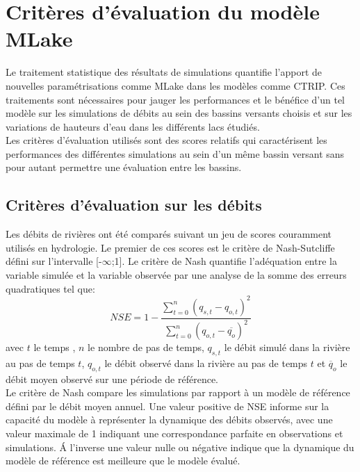 \chapter{{\selectfont Critères d'évaluation du modèle MLake}}
\label{chap:critere-evaluation}

Le traitement statistique des résultats de simulations quantifie l'apport de nouvelles paramétrisations comme MLake dans les modèles comme CTRIP. Ces traitements sont nécessaires pour jauger les performances et le bénéfice d'un tel modèle sur les simulations de débits au sein des bassins versants choisis et sur les variations de hauteurs d'eau dans les différents lacs étudiés.\\
Les critères d'évaluation utilisés sont des scores relatifs qui caractérisent les performances des différentes simulations au sein d'un même bassin versant sans pour autant permettre une évaluation entre les bassins. 

\section{{\selectfont Critères d'évaluation sur les débits}}

Les débits de rivières ont été comparés suivant un jeu de scores couramment utilisés en hydrologie. Le premier de ces scores est le critère de Nash-Sutcliffe \citep[NSE,]{nash1970} défini sur l'intervalle [-$\infty$;1]. Le critère de Nash quantifie l'adéquation entre la variable simulée et la variable observée par une analyse de la somme des erreurs quadratiques tel que: \\

\begin{equation}
NSE = 1 - \frac{\sum\limits_{t=0}^n (q_{s,t}-q_{o,t})^{2}}{\sum\limits_{t=0}^n (q_{o,t}-\overline{q_{o}})^{2}}
\end{equation}
avec $t$ le temps , $n$ le nombre de pas de temps, $q_{s,t}$ le débit simulé dans la rivière au pas de temps $t$, $q_{o,t}$ le débit observé dans la rivière au pas de temps $t$ et $\overline{q}_{o}$ le débit moyen observé sur une période de référence.\\

Le critère de Nash compare les simulations par rapport à un modèle de référence défini par le débit moyen annuel. Une valeur positive de NSE informe sur la capacité du modèle à représenter la dynamique des débits observés, avec une valeur maximale de 1 indiquant une correspondance parfaite en observations et simulations. \'A l'inverse une valeur nulle ou négative indique que la dynamique du modèle de référence est meilleure que le modèle évalué.\\

